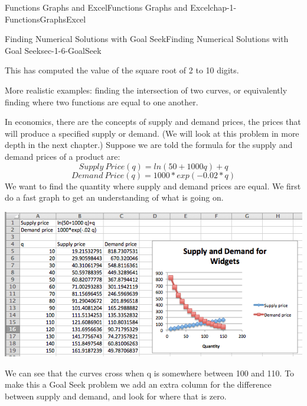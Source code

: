 \documentclass[oneside,10pt,]{book}
\numberwithin{equation}{section}
\begin{document}
\begin{chapterptx}{Functions Graphs and Excel}{}{Functions Graphs and Excel}{}{}{chap-1-FunctionsGraphsExcel}
\begin{sectionptx}{Finding Numerical Solutions with Goal Seek}{}{Finding Numerical Solutions with Goal Seek}{}{}{sec-1-6-GoalSeek}
\par
\hypertarget{p-481}{}%
This has computed the value of the square root of 2 to 10 digits.%
\par
\hypertarget{p-482}{}%
More realistic examples: finding the intersection of two curves, or equivalently finding where two functions are equal to one another.%
\par
\hypertarget{p-483}{}%
In economics, there are the concepts of supply and demand prices, the prices that will produce a specified supply or demand.  (We will look at this problem in more depth in the next chapter.)  Suppose we are told the formula for the supply and demand prices of a product are:%
\begin{equation*}
Supply\  Price (q) = ln(50 + 1000 q) + q
\end{equation*}
%
\begin{equation*}
Demand\  Price (q) = 1000*exp(-0.02*q)
\end{equation*}
We want to find the quantity where supply and demand prices are equal.  We first do a fast graph to get an understanding of what is going on. \begin{sidebyside}{1}{0.1}{0.1}{0}%
\begin{sbspanel}{0.8}%
\includegraphics[width=1\linewidth]{images/sec1-6-6.png}
\end{sbspanel}%
\end{sidebyside}%
%
\par
\hypertarget{p-484}{}%
We can see that the curves cross when q is somewhere between 100 and 110.  To make this a Goal Seek problem we add an extra column for the difference between supply and demand, and look for where that is zero. \leavevmode%
\begin{sidebyside}{1}{0.1}{0.1}{0}%
\begin{sbspanel}{0.8}%

\end{sbspanel}
\end{sidebyside}
\end{sectionptx}
\end{chapterptx}
\end{document}
